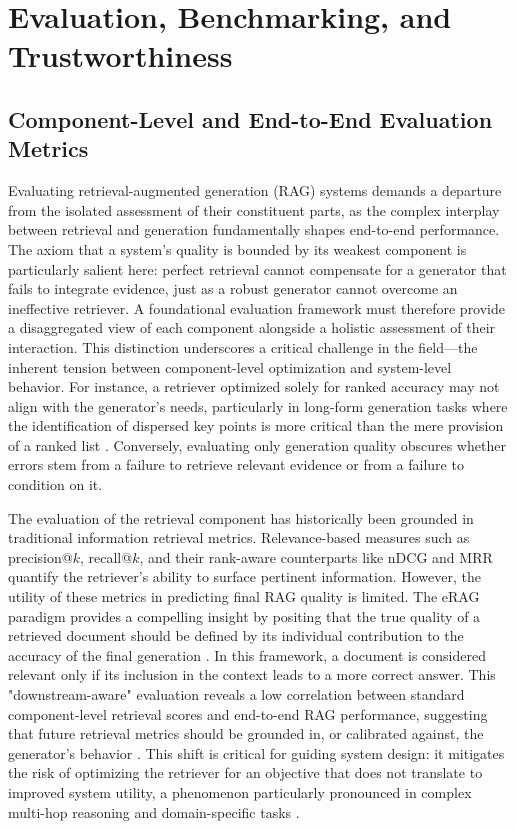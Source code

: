 \documentclass[11pt,a4paper]{article}
\begin{document}
\section{Evaluation, Benchmarking, and Trustworthiness}



\subsection{Component-Level and End-to-End Evaluation Metrics}


Evaluating retrieval-augmented generation (RAG) systems demands a departure from the isolated assessment of their constituent parts, as the complex interplay between retrieval and generation fundamentally shapes end-to-end performance. The axiom that a system's quality is bounded by its weakest component is particularly salient here: perfect retrieval cannot compensate for a generator that fails to integrate evidence, just as a robust generator cannot overcome an ineffective retriever. A foundational evaluation framework must therefore provide a disaggregated view of each component alongside a holistic assessment of their interaction. This distinction underscores a critical challenge in the field---the inherent tension between component-level optimization and system-level behavior. For instance, a retriever optimized solely for ranked accuracy may not align with the generator's needs, particularly in long-form generation tasks where the identification of dispersed key points is more critical than the mere provision of a ranked list \cite{arxiv:2506.20051v2}. Conversely, evaluating only generation quality obscures whether errors stem from a failure to retrieve relevant evidence or from a failure to condition on it.

The evaluation of the retrieval component has historically been grounded in traditional information retrieval metrics. Relevance-based measures such as precision@\(k\), recall@\(k\), and their rank-aware counterparts like nDCG and MRR quantify the retriever's ability to surface pertinent information. However, the utility of these metrics in predicting final RAG quality is limited. The eRAG paradigm provides a compelling insight by positing that the true quality of a retrieved document should be defined by its individual contribution to the accuracy of the final generation \cite{arxiv:2005.11401v4}. In this framework, a document is considered relevant only if its inclusion in the context leads to a more correct answer. This "downstream-aware" evaluation reveals a low correlation between standard component-level retrieval scores and end-to-end RAG performance, suggesting that future retrieval metrics should be grounded in, or calibrated against, the generator's behavior \cite{arxiv:2410.12837v1}. This shift is critical for guiding system design: it mitigates the risk of optimizing the retriever for an objective that does not translate to improved system utility, a phenomenon particularly pronounced in complex multi-hop reasoning and domain-specific tasks \cite{arxiv:2309.01431v2}.
\end{document}

